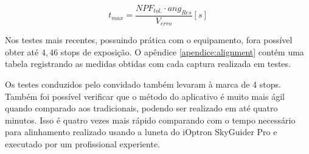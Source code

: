 \begin{equation}
	t_{max} = \dfrac{NPF_{tol.}\cdot ang_{Res} }{V_{erro}} \left[s\right]
	\label{eq:tmax}
\end{equation}

Nos testes mais recentes, possuindo prática com o equipamento, fora possível obter até $ 4,46 $ stops de exposição. O apêndice \ref{apendice:alignment} contém uma tabela registrando as medidas obtidas com cada captura realizada em testes. 

Os testes conduzidos pelo convidado também levaram à marca de 4 stops. Também foi possível verificar que o método do aplicativo é muito mais ágil quando comparado aos tradicionais, podendo ser realizado em até quatro minutos. Isso é quatro vezes mais rápido comparando com o tempo necessário para alinhamento realizado usando a luneta do iOptron SkyGuider Pro e executado por um profissional experiente. 